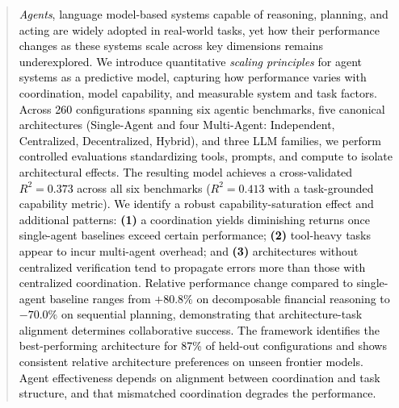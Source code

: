 \begin{abstract}
\textcolor{black}{\textit{Agents}, language model-based systems capable of reasoning, planning, and acting are widely adopted in real-world tasks, yet how their performance changes as these systems scale across key dimensions remains underexplored. We introduce quantitative \textit{scaling principles} for agent systems as a predictive model, capturing how performance varies with coordination, model capability, and measurable system and task factors. Across 260 configurations spanning six agentic benchmarks, five canonical architectures (Single-Agent and four Multi-Agent: Independent, Centralized, Decentralized, Hybrid), and three LLM families, we perform controlled evaluations standardizing tools, prompts, and compute to isolate architectural effects. The resulting model achieves a cross-validated $R^2{=}0.373$ across all six benchmarks ($R^2{=}0.413$ with a task-grounded capability metric). We identify a robust capability-saturation effect and additional patterns: \textbf{(1)} a coordination yields diminishing returns once single-agent baselines exceed certain performance; \textbf{(2)} tool-heavy tasks appear to incur multi-agent overhead; and \textbf{(3)} architectures without centralized verification tend to propagate errors more than those with centralized coordination. Relative performance change compared to single-agent baseline ranges from ${+}80.8\%$ on decomposable financial reasoning to ${-}70.0\%$ on sequential planning, demonstrating that architecture-task alignment determines collaborative success. The framework identifies the best-performing architecture for 87\% of held-out configurations and shows consistent relative architecture preferences on unseen frontier models. Agent effectiveness depends on alignment between coordination and task structure, and that mismatched coordination degrades the performance.}
\end{abstract}